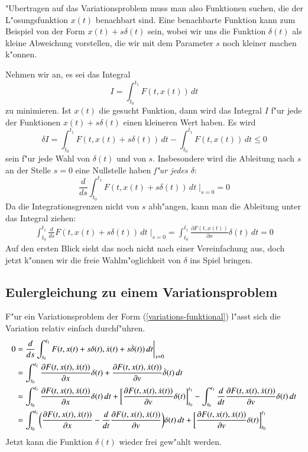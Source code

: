 "Ubertragen auf das Variationsproblem muss man also Funktionen 
suchen, die der L"osungsfunktion $x(t)$ benachbart sind.
Eine benachbarte Funktion kann zum Beispiel von der Form
$x(t)+s\delta(t)$ sein, wobei wir uns die Funktion $\delta(t)$
als kleine Abweichung vorstellen, die wir mit dem Parameter
$s$ noch kleiner machen k"onnen. 

Nehmen wir an, es sei das Integral
\begin{equation}
I=\int_{t_0}^{t_1} F(t, x(t)) \,dt
\end{equation}
zu minimieren. Ist $x(t)$ die gesucht Funktion, dann
wird das Integral $I$ f"ur jede der Funktionen $x(t)+s\delta(t)$
einen kleineren Wert haben. Es wird
\begin{equation}
\delta I =
\int_{t_0}^{t_1}F(t, x(t) + s\delta(t))\,dt
-
\int_{t_0}^{t_1}F(t, x(t))\,dt\le 0
\end{equation}
sein f"ur jede Wahl von $\delta(t)$ und von $s$. Insbesondere wird die
Ableitung nach $s$ an der Stelle $s=0$ eine Nullstelle haben
{\it f"ur jedes $\delta$}:
\begin{equation}
\frac{d}{ds}\int_{t_0}^{t_1}F(t,x(t)+s\delta(t))\,dt\;\bigg|_{s=0}=0
\end{equation}
Da die Integrationsgrenzen nicht von $s$ abh"angen, kann man die
Ableitung unter das Integral ziehen:
\begin{align*}
\int_{t_0}^{t_1}\frac{d}{ds}F(t, x(t)+s\delta(t))\,dt\;\bigg|_{s=0}
=
\int_{t_0}^{t_1}\frac{\partial F(t, x(t))}{\partial x}\delta(t)\,dt=0
\end{align*}
Auf den ersten Blick sieht das noch nicht nach einer Vereinfachung aus,
doch jetzt k"onnen wir die freie Wahlm"oglichkeit von $\delta$ ins
Spiel bringen.

\subsection{Eulergleichung zu einem Variationsproblem}
F"ur ein Variationsproblem der Form (\ref{variations-funktional})
l"asst sich die Variation relativ einfach durchf"uhren.
\begin{align}
0&=
\frac{d}{ds}
\int_{t_0}^{t_1} F(t, x(t) + s\delta(t), \dot x(t)+s\dot\delta(t))\,dt\bigg|_{s=0}
\notag
\\
&=
\int_{t_0}^{t_1} \frac{\partial F(t,x(t),\dot x(t))}{\partial x}\delta(t)
+\frac{\partial F(t,x(t),\dot x(t))}{\partial v}\dot \delta(t)\,dt
\notag
\\
&=
\int_{t_0}^{t_1} \frac{\partial F(t,x(t),\dot x(t))}{\partial x}\delta(t)\,dt
+\biggl[
\frac{\partial F(t,x(t),\dot x(t))}{\partial v}
\delta(t)
\biggr]_{t_0}^{t_1}
-\int_{t_0}^{t_1}\frac{d}{dt}\frac{\partial F(t,x(t),\dot x(t))}{\partial v}
\delta(t)\,dt
\notag
\\
&=
\int_{t_0}^{t_1}
\biggl(
\frac{\partial F(t,x(t),\dot x(t))}{\partial x}
-
\frac{d}{dt}\frac{\partial F(t,x(t),\dot x(t))}{\partial v}
\biggr)\delta(t)
\,dt
+\biggl[
\frac{\partial F(t,x(t),\dot x(t))}{\partial v}
\delta(t)
\biggr]_{t_0}^{t_1}
\label{euler-1}
\end{align}
Jetzt kann die Funktion $\delta(t)$ wieder frei gew"ahlt werden. 

